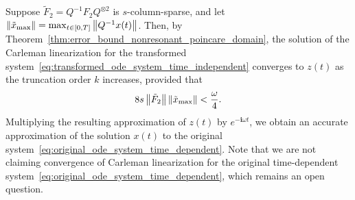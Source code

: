 \documentclass[superscriptaddress,onecolumn,nofootinbib,longbibliography,a4paper,accepted=2026-09-29]{quantumarticle}
\theoremstyle{plain}
\theoremstyle{definition}
\numberwithin{thm}{section}
\numberwithin{assumption}{section}
\numberwithin{lemma}{section}
\numberwithin{prop}{section}
\numberwithin{cor}{section}
\numberwithin{definition}{section}
\numberwithin{rmk}{section}
\numberwithin{equation}{section}
\newcommand{\norm}[1]     {\left\| #1 \right\|}
\renewcommand{\i}{\ensuremath{\mathbf{i}}}
\begin{document}
Suppose \( \tilde{F}_2 = Q^{-1} F_2 Q^{\otimes 2} \) is \( s \)-column-sparse, and let $\norm{\tilde{x}_{\rm max}}=\max_{t \in [0, T]}\norm{Q^{-1}x(t)}$. Then, by Theorem~\ref{thm:error_bound_nonresonant_poincare_domain}, the solution of the Carleman linearization for the transformed system~\eqref{eq:transformed_ode_system_time_independent} converges to \( z(t) \) as the truncation order \( k \) increases, provided that 
\begin{align}
    8 s \norm{\tilde{F}_2} \norm{\tilde{x}_{\rm max}} < \frac{\omega}{4}.
\end{align}
Multiplying the resulting approximation of \( z(t) \) by \( e^{-\i \omega t} \), we obtain an accurate approximation of the solution \( x(t) \) to the original system~\eqref{eq:original_ode_system_time_dependent}. Note that we are not claiming convergence of Carleman linearization for the original time-dependent system~\eqref{eq:original_ode_system_time_dependent}, which remains an open question.
\end{document}
